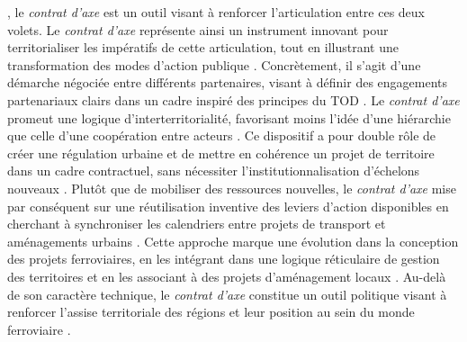 \begin{refsegment}
{}, le \textsl{contrat d’axe} est un outil visant à renforcer l’articulation entre ces deux volets. Le \textsl{contrat d’axe} représente ainsi un instrument innovant pour territorialiser les impératifs de cette articulation, tout en illustrant une transformation des modes d’action publique \textcolor{blue}{\autocite[427]{maulat_coordonner_2014}}. Concrètement, il s’agit d’une démarche négociée entre différents partenaires, visant à définir des engagements partenariaux clairs dans un cadre inspiré des principes du \acrshort{TOD} \textcolor{blue}{\autocite[1]{cerema_outils_2021}}. Le \textsl{contrat d’axe} promeut une logique d’interterritorialité, favorisant moins l'idée d'une hiérarchie que celle d'une coopération entre acteurs \textcolor{blue}{\autocite[112, 133]{vanier_pouvoir_2008}}. Ce dispositif a pour double rôle de créer une régulation urbaine et de mettre en cohérence un projet de territoire dans un cadre contractuel, sans nécessiter l'institutionnalisation d'échelons nouveaux \textcolor{blue}{\autocite[11]{cerema_articuler_2010}}. Plutôt que de mobiliser des ressources nouvelles, le \textsl{contrat d’axe} mise par conséquent sur une réutilisation inventive des leviers d’action disponibles \textcolor{blue}{\autocite[12]{cerema_articuler_2010}} en cherchant à synchroniser les calendriers entre projets de transport et aménagements urbains \textcolor{blue}{\autocite[25]{meunier-chabert_contrats_2014}}. Cette approche marque une évolution dans la conception des projets ferroviaires, en les intégrant dans une logique réticulaire de gestion des territoires et en les associant à des projets d’aménagement locaux \textcolor{blue}{\autocites[457, 468]{maulat_coordonner_2014}[94]{maulat_contractualiser_2015}}. Au-delà de son caractère technique, le \textsl{contrat d’axe} constitue un outil politique visant à renforcer l’assise territoriale des régions et leur position au sein du monde ferroviaire \textcolor{blue}{\autocite[93]{maulat_contractualiser_2015}}.%


\end{refsegment}
